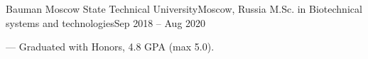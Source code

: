\resumeSubheading
{Bauman Moscow State Technical University}{Moscow, Russia}
{M.Sc. in Biotechnical systems and technologies}{Sep 2018 -- Aug 2020}
\begin{itemize}[leftmargin=0in, label={}]
    \small{\item{
        {— Graduated with Honors, 4.8 GPA (max 5.0).}\\
    }}
    \end{itemize}